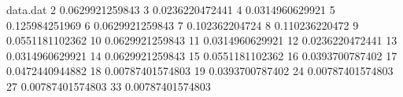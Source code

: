 \begin{filecontents}{data.dat}
  2 0.0629921259843
  3 0.0236220472441
  4 0.0314960629921
  5 0.125984251969
  6 0.0629921259843
  7 0.102362204724
  8 0.110236220472
  9 0.0551181102362
  10 0.0629921259843
  11 0.0314960629921
  12 0.0236220472441
  13 0.0314960629921
  14 0.0629921259843
  15 0.0551181102362
  16 0.0393700787402
  17 0.0472440944882
  18 0.00787401574803
  19 0.0393700787402
  24 0.00787401574803
  27 0.00787401574803
  33 0.00787401574803
\end{filecontents}
